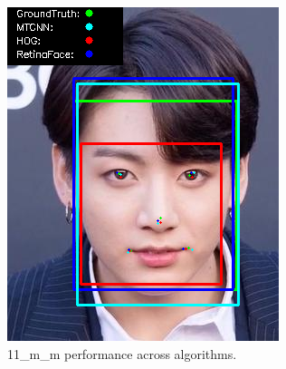 \documentclass{l4proj}
\begin{document}
\begin{appendices}
\begin{figure}[h!]
\begin{minipage}{0.49\textwidth}
     \includegraphics[width=\textwidth]{images/appendix/11.png}
    \caption{11\_m\_m performance across algorithms.}
    \label{whoopi_result}
  \end{minipage}
\end{figure}


\end{appendices}
\end{document}
